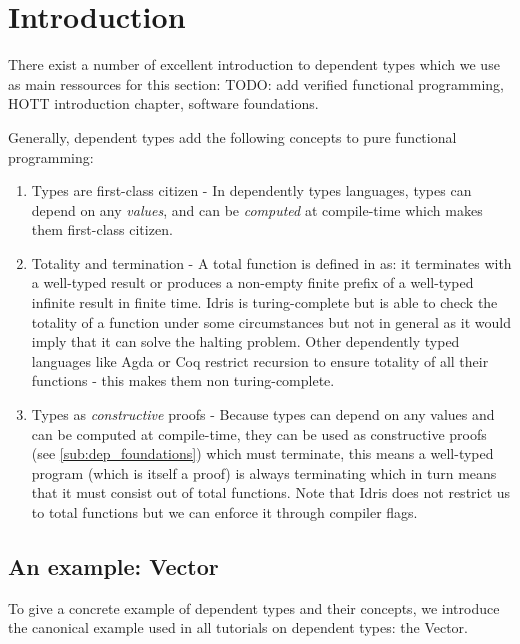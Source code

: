 \section{Introduction}
\label{sec:dep_background}

There exist a number of excellent introduction to dependent types which we use as main ressources for this section: \cite{thompson_type_1991, brady_type-driven_2017} TODO: add verified functional programming, HOTT introduction chapter, software foundations.

Generally, dependent types add the following concepts to pure functional programming:

\begin{enumerate}
	\item Types are first-class citizen - In dependently types languages, types can depend on any \textit{values}, and can be \textit{computed} at compile-time which makes them first-class citizen.

	\item Totality and termination - A total function is defined in \cite{brady_type-driven_2017} as: it terminates with a well-typed result or produces a non-empty finite prefix of a well-typed infinite result in finite time. Idris is turing-complete but is able to check the totality of a function under some circumstances but not in general as it would imply that it can solve the halting problem. Other dependently typed languages like Agda or Coq restrict recursion to ensure totality of all their functions - this makes them non turing-complete.

	\item Types as \textit{constructive} proofs - Because types can depend on any values and can be computed at compile-time, they can be used as constructive proofs (see \ref{sub:dep_foundations}) which must terminate, this means a well-typed program (which is itself a proof) is always terminating which in turn means that it must consist out of total functions. Note that Idris does not restrict us to total functions but we can enforce it through compiler flags.
\end{enumerate}

\subsection{An example: Vector}
To give a concrete example of dependent types and their concepts, we introduce the canonical example used in all tutorials on dependent types: the Vector.

